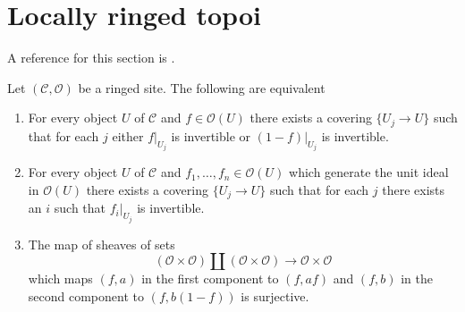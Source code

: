 \section{Locally ringed topoi}
\label{section-locally-ringed}


\noindent
A reference for this section is
\cite[Expos\'e IV, Exercice 13.9]{SGA4}.

\begin{lemma}
\label{lemma-locally-ringed}
Let $(\mathcal{C}, \mathcal{O})$ be a ringed site. The following
are equivalent
\begin{enumerate}
\item For every object $U$ of $\mathcal{C}$ and $f \in \mathcal{O}(U)$
there exists a covering $\{U_j \to U\}$ such that for each $j$
either $f|_{U_j}$ is invertible or $(1 - f)|_{U_j}$ is invertible.
\item For every object $U$ of $\mathcal{C}$ and
$f_1, \ldots, f_n \in \mathcal{O}(U)$ which generate the unit ideal
in $\mathcal{O}(U)$  there exists a covering $\{U_j \to U\}$
such that for each $j$ there exists an $i$ such that $f_i|_{U_j}$
is invertible.
\item The map of sheaves of sets
$$
(\mathcal{O} \times \mathcal{O})
\amalg
(\mathcal{O} \times \mathcal{O})
\longrightarrow
\mathcal{O} \times \mathcal{O}
$$
which maps $(f, a)$ in the first component to $(f, af)$ and
$(f, b)$ in the second component to $(f, b(1 - f))$ is surjective.
\end{enumerate}
\end{lemma}

